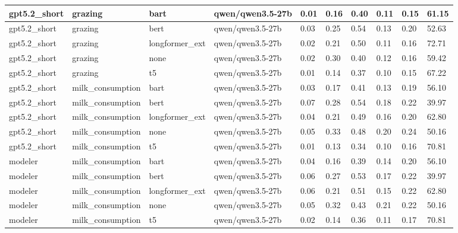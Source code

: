 \begin{tabular}{|l|l|l|l|l|l|l|l|l|l|}
 \hline
 gpt5.2\_short & grazing & bart & qwen/qwen3.5-27b & 0.01 & 0.16 & 0.40 & 0.11 & 0.15 & 61.15 \\
 \hline
 gpt5.2\_short & grazing & bert & qwen/qwen3.5-27b & 0.03 & 0.25 & 0.54 & 0.13 & 0.20 & 52.63 \\
 \hline
 gpt5.2\_short & grazing & longformer\_ext & qwen/qwen3.5-27b & 0.02 & 0.21 & 0.50 & 0.11 & 0.16 & 72.71 \\
 \hline
 gpt5.2\_short & grazing & none & qwen/qwen3.5-27b & 0.02 & 0.30 & 0.40 & 0.12 & 0.16 & 59.42 \\
 \hline
 gpt5.2\_short & grazing & t5 & qwen/qwen3.5-27b & 0.01 & 0.14 & 0.37 & 0.10 & 0.15 & 67.22 \\
 \hline
 gpt5.2\_short & milk\_consumption & bart & qwen/qwen3.5-27b & 0.03 & 0.17 & 0.41 & 0.13 & 0.19 & 56.10 \\
 \hline
 gpt5.2\_short & milk\_consumption & bert & qwen/qwen3.5-27b & 0.07 & 0.28 & 0.54 & 0.18 & 0.22 & 39.97 \\
 \hline
 gpt5.2\_short & milk\_consumption & longformer\_ext & qwen/qwen3.5-27b & 0.04 & 0.21 & 0.49 & 0.16 & 0.20 & 62.80 \\
 \hline
 gpt5.2\_short & milk\_consumption & none & qwen/qwen3.5-27b & 0.05 & 0.33 & 0.48 & 0.20 & 0.24 & 50.16 \\
 \hline
 gpt5.2\_short & milk\_consumption & t5 & qwen/qwen3.5-27b & 0.01 & 0.13 & 0.34 & 0.10 & 0.16 & 70.81 \\
 \hline
 modeler & milk\_consumption & bart & qwen/qwen3.5-27b & 0.04 & 0.16 & 0.39 & 0.14 & 0.20 & 56.10 \\
 \hline
 modeler & milk\_consumption & bert & qwen/qwen3.5-27b & 0.06 & 0.27 & 0.53 & 0.17 & 0.22 & 39.97 \\
 \hline
 modeler & milk\_consumption & longformer\_ext & qwen/qwen3.5-27b & 0.06 & 0.21 & 0.51 & 0.15 & 0.22 & 62.80 \\
 \hline
 modeler & milk\_consumption & none & qwen/qwen3.5-27b & 0.05 & 0.32 & 0.43 & 0.21 & 0.22 & 50.16 \\
 \hline
 modeler & milk\_consumption & t5 & qwen/qwen3.5-27b & 0.02 & 0.14 & 0.36 & 0.11 & 0.17 & 70.81 \\
\hline
\end{tabular}
